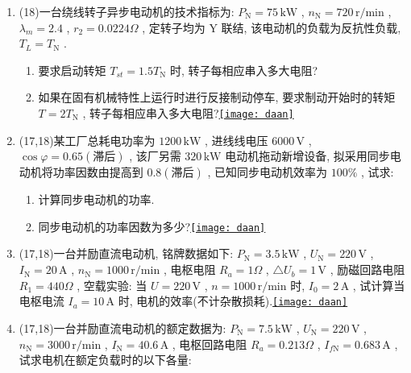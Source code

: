 \documentclass[lang=cn,11pt,marginpar=margintrue]{elegantbook}%
\newcommand{\daan}[1]{\hfill\hyperref[#1]{\texttt{[image: daan]}}}
\newcommand{\zt}[1]{\,\mathrm{#1}}
\newcommand{\NN}{\mathrm{N}}
\begin{document}
\begin{enumerate}
		\begin{enumerate}
			\item 采用能耗制动和电压反接制动停车, 如要求最短制动时间则电枢中应分别串入多大电阻?
			\item 两种制动方法在制动到 $n=0$ 时, 电磁转矩各是多大?
			\item 要使电动机以 $-500\zt{r/min}$ 的转速下放位能负载, $T=T_{\NN}$ , 采用能耗制动运行时, 电枢应串入多大电阻?
			\item 如要求以 $1000\zt{rpm}$\footnote{$\zt{rpm=Revolution/Minute=r/min}$} 下放位能负载 $T=T_{\NN}$ , 则应采取那种制动方式, 制动电阻多大?\daan{js:13}
		\end{enumerate}
	\item (18)一台绕线转子异步电动机的技术指标为: $P_{\NN}=75\zt{kW}$ , $n_{\NN}=720\zt{r/min}$ , $\lambda_{m}=2.4$ , $r_2=0.0224\Omega$ , 定转子均为 $\mathrm{Y}$  联结, 该电动机的负载为反抗性负载, $T_{L}=T_{\NN}$ .
		\begin{enumerate}
			\item 要求启动转矩 $T_{st}=1.5T_{\NN}$ 时, 转子每相应串入多大电阻?
			\item 如果在固有机械特性上运行时进行反接制动停车, 要求制动开始时的转矩 $T=2T_{\NN}$ , 转子每相应串入多大电阻?\daan{js:14}
		\end{enumerate}
	\item (17,18)某工厂总耗电功率为 $1200\zt{kW}$ , 进线线电压 $6000\zt{V}$ , $\cos\varphi=0.65(\text{滞后})$ , 该厂另需 $320\zt{kW}$ 电动机拖动新增设备, 拟采用同步电动机将功率因数由提高到 $0.8(\text{滞后})$ , 已知同步电动机效率为 $100\%$ , 试求:
		\begin{enumerate}
			\item 计算同步电动机的功率.
			\item 同步电动机的功率因数为多少?\daan{js:15}
		\end{enumerate}
	\item (17,18)一台并励直流电动机, 铭牌数据如下: $P_{\NN}=3.5\zt{kW}$ , $U_{\NN}=220\zt{V}$ , $I_{\NN}=20\zt{A}$ , $n_{\NN}=1000\zt{r/min}$ , 电枢电阻 $R_a=1\Omega$ , $\triangle U_b=1\zt{V}$ , 励磁回路电阻 $R_1=440\Omega$ , 空载实验: 当 $U=220\zt{V}$ , $n=1000\zt{r/min}$ 时, $I_0=2\zt{A}$ , 试计算当电枢电流 $I_a=10\zt{A}$ 时, 电机的效率(不计杂散损耗).\daan{js:16}
	\item (17,18)一台并励直流电动机的额定数据为: $P_{\NN}=7.5\zt{kW}$ , $U_{\NN}=220\zt{V}$ , $n_{\NN}=3000\zt{r/min}$ , $I_{\NN}=40.6\zt{A}$ , 电枢回路电阻 $R_a=0.213\Omega$ , $I_{f\NN}=0.683\zt{A}$ , 试求电机在额定负载时的以下各量:
		\begin{enumerate}

\end{enumerate}
\end{enumerate}
\end{document}
